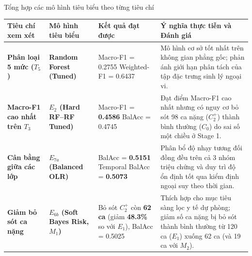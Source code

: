 \begin{table}{Tổng hợp các mô hình tiêu biểu theo từng tiêu chí}
\centering
\footnotesize
\setlength{\tabcolsep}{4pt}
\label{tab:executive-decision-matrix}
\begin{tabularx}{\textwidth}{p{3.2cm} p{3.0cm} p{3.2cm} X}
\toprule
\textbf{Tiêu chí xem xét} & \textbf{Mô hình tiêu biểu} & \textbf{Kết quả đạt được} & \textbf{Ý nghĩa thực tiễn và Đánh giá} \\
\midrule
\textbf{Phân loại 5 mức ($T_5$)} & \textbf{Random Forest (Tuned)} & Macro-F1 = 0.2755 \newline Weighted-F1 = 0.6437 & Mô hình cơ sở tốt nhất trên không gian phẳng gốc; phản ánh giới hạn phân tách của tập đặc trưng sinh lý ngoại vi. \\
\midrule
\textbf{Macro-F1 cao nhất trên $T_3$} & \textbf{$E_2$ (Hard RF--RF Tuned)} & Macro-F1 = \textbf{0.4586} \newline BalAcc = 0.4745 & Đạt điểm Macro-F1 cao nhất nhưng có nguy cơ bỏ sót 98 ca nặng ($C_2^+$) thành bình thường ($C_0$) do sai số một chiều ở Stage 1. \\
\midrule
\textbf{Cân bằng giữa các lớp} & \textbf{$E_{7a}$ (Balanced OLR)} & BalAcc = \textbf{0.5151} \newline Temporal BalAcc = \textbf{0.5073} & Phân bổ độ nhạy tương đối đồng đều trên cả 3 nhóm triệu chứng và duy trì độ ổn định tốt qua kiểm định ngoại suy theo thời gian. \\
\midrule
\textbf{Giảm bỏ sót ca nặng} & \textbf{$E_{6b}$ (Soft Bayes Risk, $M_1$)} & Bỏ sót $C_2^+$ còn \textbf{62 ca} \newline (giảm \textbf{48.3\%} so với $E_1$), BalAcc = 0.5025 & Thích hợp cho mục tiêu sàng lọc y tế dự phòng; giảm số ca nặng bị bỏ sót thành bình thường từ 120 ca ($E_1$) xuống 62 ca (và 19 ca với $M_2$). \\
\bottomrule
\end{tabularx}
\end{table}
